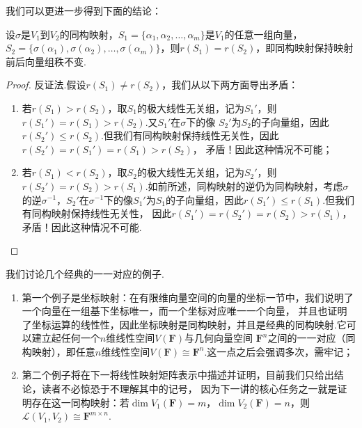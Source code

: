 \begin{enumerate}
    我们可以更进一步得到下面的结论：
    \begin{theorem}\label{thm:6:同构保秩}
        设$\sigma$是$V_1$到$V_2$的同构映射，$S_1=\{\alpha_1,\alpha_2,\ldots,\alpha_m\}$是$V_1$的任意一组向量，
        $S_2=\{\sigma(\alpha_1),\sigma(\alpha_2),\ldots,\sigma(\alpha_m)\}$，则$r(S_1)=r(S_2)$，即同构映射保持映射前后向量组秩不变.
    \end{theorem}
    \begin{proof}
        反证法.假设$r(S_1)\neq r(S_2)$，我们从以下两方面导出矛盾：
        \begin{enumerate}
            \item 若$r(S_1)>r(S_2)$，取$S_1$的极大线性无关组，记为$S_1'$，则$r(S_1')=r(S_1)>r(S_2)$.又$S_1'$在$\sigma$下的像
            $S_2'$为$S_2$的子向量组，因此$r(S_2')\leqslant r(S_2)$.但我们有同构映射保持线性无关性，因此$r(S_2')=r(S_1')=r(S_1)>r(S_2)$，
            矛盾！因此这种情况不可能；

            \item 若$r(S_1)<r(S_2)$，取$S_2$的极大线性无关组，记为$S_2'$，则$r(S_2')=r(S_2)>r(S_1)$.如前所述，同构映射的逆仍为同构映射，考虑$\sigma$
            的逆$\sigma^{-1}$，$S_2'$在$\sigma^{-1}$下的像$S_1'$为$S_1$的子向量组，因此$r(S_1')\leqslant r(S_1)$.但我们有同构映射保持线性无关性，
            因此$r(S_1')=r(S_2')=r(S_2)>r(S_1)$，矛盾！因此这种情况不可能.
        \end{enumerate}
    \end{proof}
\end{enumerate}


我们讨论几个经典的一一对应的例子.
\begin{enumerate}
    \item 第一个例子是坐标映射：在有限维向量空间的向量的坐标一节中，我们说明了一个向量在一组基下坐标唯一，而一个坐标对应唯一一个向量，
    并且也证明了坐标运算的线性性，因此坐标映射是同构映射，并且是经典的同构映射.它可以建立起任何一个$n$维线性空间$V(\mathbf{F})$与几何向量空间
    $\mathbf{F}^n$之间的一一对应（同构映射），即任意$n$维线性空间$V(\mathbf{F})\cong\mathbf{F}^n$.这一点之后会强调多次，需牢记；

    \item 第二个例子将在下一将线性映射矩阵表示中描述并证明，目前我们只给出结论，读者不必惊恐于不理解其中的记号，
    因为下一讲的核心任务之一就是证明存在这一同构映射：若$\dim V_1(\mathbf{F})=m$，$\dim V_2(\mathbf{F})=n$，则
    $\mathcal{L}(V_1,V_2) \cong \mathbf{F}^{m \times n}$.
\end{enumerate}

